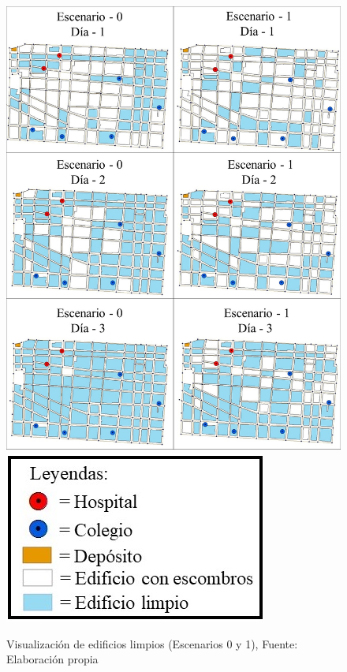 \documentclass[letterpaper,conference]{IEEEtran}
\begin{document}
\begin{figure}[h!]
\centering
\includegraphics[scale=0.25]{Figuras/visu2.jpg} 
\includegraphics[scale=0.45]{Figuras/simb2.jpg}
\caption{Visualización de edificios limpios  (Escenarios 0 y 1), Fuente: Elaboración propia}
\label{fig:esc01-visu}
\end{figure}


\end{document}
